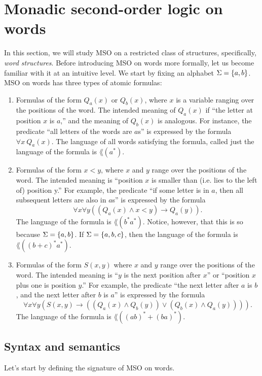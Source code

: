 \documentclass[11pt,twoside=off,numbers=noenddot]{scrbook}
\begin{document}
\section{Monadic second-order logic on words}
In this section, we will study MSO on a restricted class of structures, specifically, \emph{word structures}. Before introducing MSO on words more formally, let us become familiar with it at an intuitive level. We start by fixing an alphabet $\Sigma = \{ a, b \}$. MSO on words has three types of atomic formulas:
\begin{enumerate}
  \item Formulas of the form $Q_a(x)$ or $Q_b(x)$, where $x$ is a variable ranging over the positions of the word. The intended meaning of $Q_a(x)$ if ``the letter at position $x$ is $a$,'' and the meaning of $Q_b(x)$ is analogous. For instance, the predicate ``all letters of the words are $a$s'' is expressed by the formula $\forall x \ Q_a(x)$. The language of all words satisfying the formula, called just the language of the formula is $\lang(a^\ast)$.
  \item Formulas of the form $x < y$, where $x$ and $y$ range over the positions of the word. The intended meaning is ``position $x$ is smaller than (i.e. lies to the left of) position y.'' For example, the predicate ``if some letter is in $a$, then all subsequent letters are also in $a$s'' is expressed by the formula
    \[ \forall x \forall y ((Q_a(x) \wedge x < y) \rightarrow Q_a(y)). \]
    The language of the formula is $\lang(b^\ast a^\ast)$. Notice, however, that this is so because $\Sigma = \{ a, b \}$. If $\Sigma = \{ a, b, c \}$, then the language of the formula is $\lang((b + c)^\ast a^\ast)$.
  \item Formulas of the form $S(x, y)$ where $x$ and $y$ range over the positions of the word. The intended meaning is ``$y$ is the next position after $x$'' or ``position $x$ plus one is position $y$.'' For example, the predicate ``the next letter after $a$ is $b$, and the next letter after $b$ is $a$'' is expressed by the formula
    \[ \forall x \forall y (S(x, y) \rightarrow ((Q_a(x) \wedge Q_b(y)) \vee (Q_b(x) \wedge Q_a(y)))). \]
    The language of the formula is $\lang((ab)^\ast + (ba)^\ast)$.
\end{enumerate}

\subsection{Syntax and semantics}
Let's start by defining the signature of MSO on words.
\end{document}
